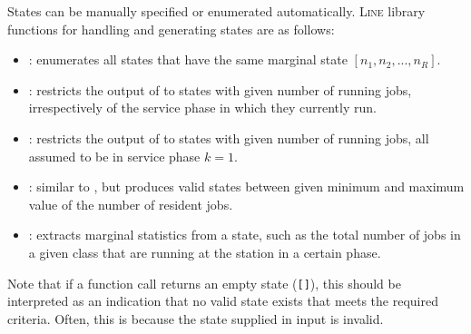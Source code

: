 States can be manually specified or enumerated automatically. \textsc{Line} library functions for handling and generating states are as follows:
\begin{itemize}
\item {}: enumerates all states that have the same marginal state $[n_{1},n_{2},...,n_{R}]$.
\item {}: restricts the output of  to states with given number of running jobs, irrespectively of the service phase in which they currently run.
\item {}: restricts the output of  to states with given number of running jobs, all assumed to be in service phase $k=1$.
\item {}: similar to , but produces valid states between given minimum and maximum value of the number of resident jobs.
\item {}: extracts marginal statistics from a state, such as the total number of jobs in a given class that are running at the station in a certain phase.
\end{itemize}
Note that if a function call returns an empty state (\texttt{[]}), this should be interpreted as an indication that no valid state exists that meets the required criteria. Often, this is because the state supplied in input is invalid.

